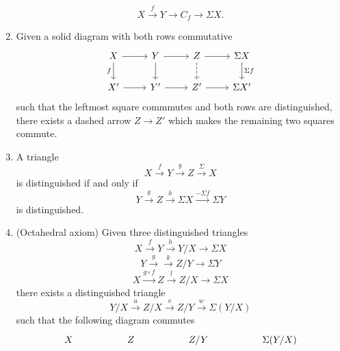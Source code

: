 \documentclass[../main.tex]{subfiles}
\begin{document}
\begin{definition}
\begin{enumerate}[label={\textbf{TR\arabic*}}]
        \[X\xrightarrow fY\to C_f\to\Sigma X.\]
        \item Given a solid diagram with both rows commutative
        \[\begin{tikzcd}
            X & Y & Z & {\Sigma X} \\
            {X'} & {Y'} & {Z'} & {\Sigma X'}
            \arrow[from=1-1, to=1-2]
            \arrow[from=1-2, to=1-3]
            \arrow[from=1-3, to=1-4]
            \arrow["f"', from=1-1, to=2-1]
            \arrow[from=2-1, to=2-2]
            \arrow[from=2-2, to=2-3]
            \arrow[from=2-3, to=2-4]
            \arrow[from=1-2, to=2-2]
            \arrow[dashed, from=1-3, to=2-3]
            \arrow["{\Sigma f}", from=1-4, to=2-4]
        \end{tikzcd}\]
        such that the leftmost square commmutes and both rows are distinguished, there exists a dashed arrow $Z\to Z'$ which makes the remaining two squares commute.
        \item A triangle
        \[X\xrightarrow fY\xrightarrow gZ\xrightarrow\Sigma X\]
        is distinguished if and only if
        \[Y\xrightarrow gZ\xrightarrow h\Sigma X\xrightarrow{-\Sigma f}\Sigma Y\]
        is distinguished.
        \item (Octahedral axiom) Given three distinguished triangles
        \[X\xrightarrow fY\xrightarrow h Y/X\to\Sigma X\]
        \[Y\xrightarrow g\xrightarrow k Z/Y\to\Sigma Y\]
        \[X\xrightarrow{g\circ f}Z\xrightarrow lZ/X\to\Sigma X\]
        there exists a distinguished triangle
        \[Y/X\xrightarrow uZ/X\xrightarrow vZ/Y\xrightarrow w\Sigma(Y/X)\]
        such that the following diagram commutes
        \[\begin{tikzcd}
            X && Z && {Z/Y} && {\Sigma(Y/X)} \\

\end{tikzcd}\]
\end{enumerate}
\end{definition}
\end{document}
